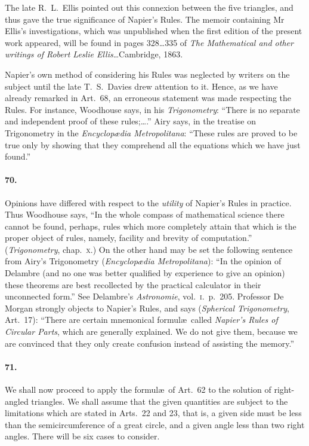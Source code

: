 \documentclass{book}[2004/02/16]
\begin{document}
\begin{mainmatter}
\begin{spacing}{1.3}
The late R.~L.\ Ellis pointed out this connexion between the
five triangles, and thus gave the true significance of Napier's
Rules. The memoir containing Mr Ellis's investigations, which
was unpublished when the first edition of the present work appeared,
will be found in pages 328\ldots335 of \textit{The Mathematical and
other writings of Robert Leslie Ellis}\dots Cambridge, 1863.

Napier's own method of considering his Rules was neglected
by writers on the subject until the late T.~S.\ Davies drew attention
to it. Hence, as we have already remarked in Art.\ 68, an
erroneous statement was made respecting the Rules. For instance,
Woodhouse says, in his \textit{Trigonometry}: ``There is no separate
and independent proof of these rules;\ldots.'' Airy says, in the
treatise on Trigonometry in the \textit{Encyclop\ae dia Metropolitana}:
``These rules are proved to be true only by showing that they comprehend
all the equations which we have just found.''

\paragraph{70.} Opinions have differed with respect to the \textit{utility} of
Napier's Rules in practice. Thus Woodhouse says, ``In the whole
compass of mathematical science there cannot be found, perhaps,
rules which more completely attain that which is the proper
object of rules, namely, facility and brevity of computation.''
(\textit{Trigonometry}, chap.\ \textsc{x}.) On the other hand may be set the following
sentence from Airy's Trigonometry (\textit{Encyclop\ae dia Metropolitana}):
``In the opinion of Delambre (and no one was better
qualified by experience to give an opinion) these theorems are best
recollected by the practical calculator in their unconnected form.''
See Delambre's \textit{Astronomie}, vol.~\textsc{i}.\ p.~205. Professor De Morgan
strongly objects to Napier's Rules, and says (\textit{Spherical Trigonometry},
Art.~17): ``There are certain mnemonical formul\ae\ called
\textit{Napier's Rules of Circular Parts}, which are generally explained.
We do not give them, because we are convinced that they only
create confusion instead of assisting the memory.''

\paragraph{71.} We shall now proceed to apply the formul\ae\ of Art.\ 62
to the solution of right-angled triangles. We shall assume that
the given quantities are subject to the limitations which are stated
in Arts.\ 22 and 23, that is, a given side must be less than the
semicircumference of a great circle, and a given angle less than
two right angles. There will be six cases to consider.


\end{spacing}
\end{mainmatter}
\end{document}
